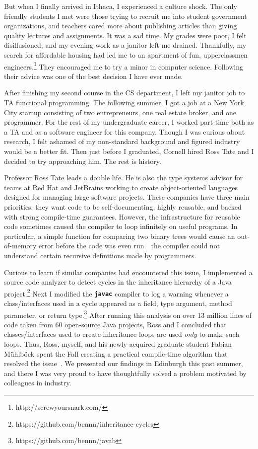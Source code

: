 \documentclass[12pt]{article}
\newcommand{\mono}[1]{\textbf{\texttt{#1}}}
\newcommand{\hdr}[2]{\vspace{-0.4cm}{\flushleft{\hrulefill\\\textbf{#1}\hfill{#2}\\\vspace{-0.2cm}\hrulefill}}\vspace{0.1cm}}
\begin{document}
But when I finally arrived in Ithaca, I experienced a culture shock.
The only friendly students I met were those trying to recruit me into student government organizations, and teachers cared more about publishing articles than giving quality lectures and assignments.
It was a sad time.
My grades were poor, I felt disillusioned, and my evening work as a janitor left me drained.
Thankfully, my search for affordable housing had led me to an apartment of fun, upperclassmen engineers.\footnote{http://screwyoursnark.com/}
They encouraged me to try a minor in computer science.
Following their advice was one of the best decision I have ever made.

After finishing my second course in the CS department, I left my janitor job to TA functional programming.
The following summer, I got a job at a New York City startup consisting of two entrepreneurs, one real estate broker, and one programmer.
For the rest of my undergraduate career, I worked part-time both as a TA and as a software engineer for this company.
Though I was curious about research, I felt ashamed of my non-standard background and figured industry would be a better fit.
Then just before I graduated, Cornell hired Ross Tate and I decided to try approaching him.
The rest is history.

\hdr{Decidable Subtyping for Object-Oriented Langauges}{Summer~\textendash~Fall 2013}

Professor Ross Tate leads a double life.
He is also the type systems advisor for teams at Red Hat and JetBrains working to create object-oriented languages designed for managing large software projects.
These companies have three main priorities: they want code to be self-documenting, highly reusable, and backed with strong compile-time guarantees.
However, the infrastructure for reusable code sometimes caused the compiler to loop infinitely on useful programs.
In particular, a simple function for comparing two binary trees would cause an out-of-memory error before the code was even run~\textemdash~the compiler could not understand certain recursive definitions made by programmers.

Curious to learn if similar companies had encountered this issue, I implemented a source code analyzer to detect cycles in the inheritance hierarchy of a Java project.\footnote{https://github.com/bennn/inheritance-cycles}
Next I modified the \mono{javac} compiler to log a warning whenever a class/interfaces used in a cycle appeared as a field, type argument, method parameter, or return type.\footnote{https://github.com/bennn/javab}
After running this analysis on over 13 million lines of code taken from 60 open-source Java projects, Ross and I concluded that classes/interfaces used to create inheritance loops are used \emph{only} to make such loops.
Thus, Ross, myself, and his newly-acquired graduate student Fabian M\"uhlb\"ock spent the Fall creating a practical compile-time algorithm that resolved the issue~\cite{shapes}.
We presented our findings in Edinburgh this past summer, and there I was very proud to have thoughtfully solved a problem motivated by colleagues in industry.
\end{document}

